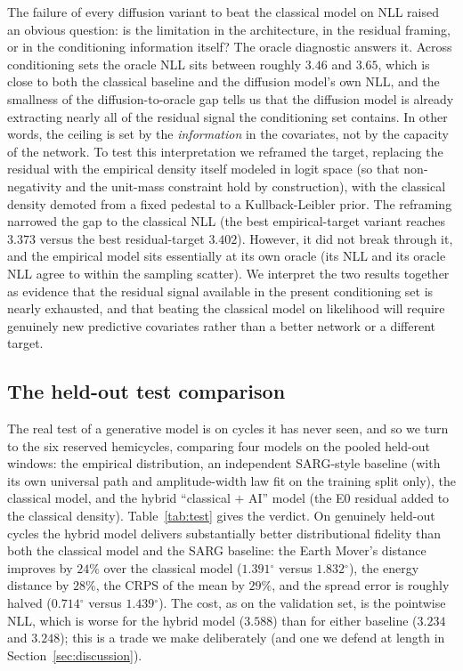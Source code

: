 \documentclass[twocolumn]{aastex631}
\newcommand{\degr}{\ensuremath{^{\circ}}}
\begin{document}
The failure of every diffusion variant to beat the classical model on NLL raised
an obvious question: is the limitation in the architecture, in the residual
framing, or in the conditioning information itself? The oracle diagnostic answers
it. Across conditioning sets the oracle NLL sits between roughly $3.46$ and
$3.65$, which is close to both the classical baseline and the diffusion model's
own NLL, and the smallness of the diffusion-to-oracle gap tells us that the
diffusion model is already extracting nearly all of the residual signal the
conditioning set contains. In other words, the ceiling is set by the
\emph{information} in the covariates, not by the capacity of the network. To test
this interpretation we reframed the target, replacing the residual with the
empirical density itself modeled in logit space (so that non-negativity and the
unit-mass constraint hold by construction), with the classical density demoted
from a fixed pedestal to a Kullback-Leibler prior. The reframing narrowed the gap
to the classical NLL (the best empirical-target variant reaches $3.373$ versus
the best residual-target $3.402$). However, it did not break through it, and the
empirical model sits essentially at its own oracle (its NLL and its oracle NLL
agree to within the sampling scatter). We interpret the two results
together as evidence that the residual signal available in the present
conditioning set is nearly exhausted, and that beating the classical model on
likelihood will require genuinely new predictive covariates rather than a better
network or a different target.

\subsection{The held-out test comparison}
\label{sec:test}

The real test of a generative model is on cycles it has never seen, and so we
turn to the six reserved hemicycles, comparing four models on the pooled
held-out windows: the empirical distribution, an independent SARG-style baseline
(with its own universal path and amplitude-width law fit on the training split
only), the classical model, and the hybrid ``classical $+$ AI'' model (the E0
residual added to the classical density). Table~\ref{tab:test} gives the
verdict. On genuinely held-out cycles the hybrid model delivers substantially
better distributional fidelity than both the classical model and the SARG
baseline: the Earth Mover's distance improves by $24\%$ over the classical model
($1.391\degr$ versus $1.832\degr$), the energy distance by $28\%$, the CRPS of
the mean by $29\%$, and the spread error is roughly halved ($0.714\degr$ versus
$1.439\degr$). The cost, as on the validation set, is the pointwise NLL, which is
worse for the hybrid model ($3.588$) than for either baseline ($3.234$ and
$3.248$); this is a trade we make deliberately (and one we defend at length in
Section~\ref{sec:discussion}).
\end{document}
